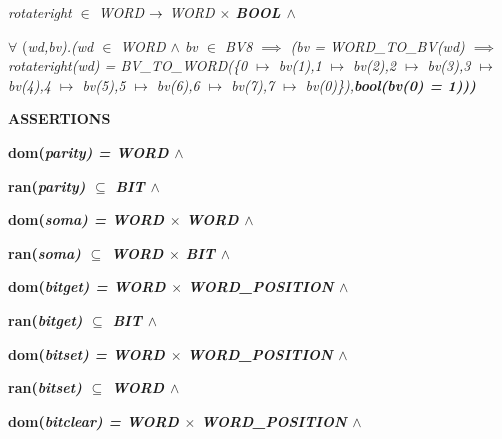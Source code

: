 \begin{sloppypar}
\hspace*{0.10in}\it rotateright $\in$  \it WORD  $\rightarrow$  \it WORD $\times$ \bf BOOL  $\land$ 

\hspace*{0.10in} $\forall$ \rm (\it wd\rm ,\it bv\rm )\rm .\rm (\it wd $\in$  \it WORD  $\land$  \it bv $\in$  \it BV8  $\implies$  \rm (\it bv \rm = \it WORD\_TO\_BV\rm (\it wd\rm )  $\implies$  \it rotateright\rm (\it wd\rm ) \rm = \it BV\_TO\_WORD\rm (\rm \{\rm 0 $\mapsto$ \it bv\rm (\rm 1\rm )\rm ,\rm 1 $\mapsto$ \it bv\rm (\rm 2\rm )\rm ,\rm 2 $\mapsto$ \it bv\rm (\rm 3\rm )\rm ,\rm 3 $\mapsto$ \it bv\rm (\rm 4\rm )\rm ,\rm 4 $\mapsto$ \it bv\rm (\rm 5\rm )\rm ,\rm 5 $\mapsto$ \it bv\rm (\rm 6\rm )\rm ,\rm 6 $\mapsto$ \it bv\rm (\rm 7\rm )\rm ,\rm 7 $\mapsto$ \it bv\rm (\rm 0\rm )\rm \}\rm )\rm ,\bf bool\rm (\it bv\rm (\rm 0\rm ) \rm = \rm 1\rm )\rm )\rm )   

\hspace*{0.10in}

\hspace*{0.10in}

\bf ASSERTIONS

\hspace*{0.10in}\bf dom\rm (\it parity\rm ) \rm = \it WORD  $\land$ 

\hspace*{0.10in}\bf ran\rm (\it parity\rm )  $\subseteq$  \it BIT  $\land$ 

\hspace*{0.10in}\bf dom\rm (\it soma\rm ) \rm = \it WORD $\times$ \it WORD  $\land$ 

\hspace*{0.10in}\bf ran\rm (\it soma\rm )  $\subseteq$  \it WORD $\times$ \it BIT  $\land$ 

\hspace*{0.10in}\bf dom\rm (\it bitget\rm ) \rm = \it WORD $\times$ \it WORD\_POSITION  $\land$ 

\hspace*{0.10in}\bf ran\rm (\it bitget\rm )  $\subseteq$  \it BIT  $\land$ 

\hspace*{0.10in}\bf dom\rm (\it bitset\rm ) \rm = \it WORD $\times$ \it WORD\_POSITION  $\land$ 

\hspace*{0.10in}\bf ran\rm (\it bitset\rm )  $\subseteq$  \it WORD  $\land$ 

\hspace*{0.10in}\bf dom\rm (\it bitclear\rm ) \rm = \it WORD $\times$ \it WORD\_POSITION  $\land$ 


\end{sloppypar}
